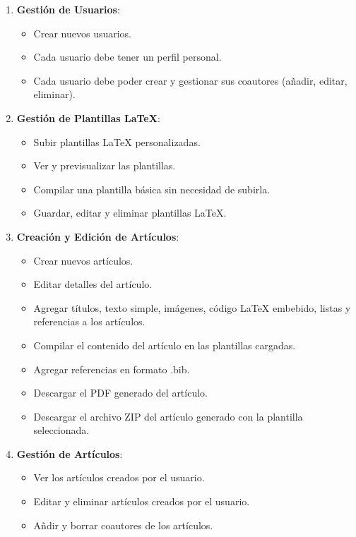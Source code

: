 \begin{enumerate}
    \item \textbf{Gestión de Usuarios}:
    \begin{itemize}
        \item Crear nuevos usuarios.
        \item Cada usuario debe tener un perfil personal.
        \item Cada usuario debe poder crear y gestionar sus coautores (añadir, editar, eliminar).
    \end{itemize}

    \item \textbf{Gestión de Plantillas LaTeX}:
    \begin{itemize}
        \item Subir plantillas LaTeX personalizadas.
        \item Ver y previsualizar las plantillas.
        \item Compilar una plantilla básica sin necesidad de subirla.
        \item Guardar, editar y eliminar plantillas LaTeX.
    \end{itemize}

    \item \textbf{Creación y Edición de Artículos}:
    \begin{itemize}
        \item Crear nuevos artículos.
        \item Editar detalles del artículo.
        \item Agregar títulos, texto simple, imágenes, código LaTeX embebido, listas y referencias a los artículos.
        \item Compilar el contenido del artículo en las plantillas cargadas.
        \item Agregar referencias en formato .bib.
        \item Descargar el PDF generado del artículo.
        \item Descargar el archivo ZIP del artículo generado con la plantilla seleccionada.
    \end{itemize}

    \item \textbf{Gestión de Artículos}:
    \begin{itemize}
        \item Ver los artículos creados por el usuario.
        \item Editar y eliminar artículos creados por el usuario.
        \item Añdir y borrar coautores de los artículos.
    \end{itemize}


\end{enumerate}
